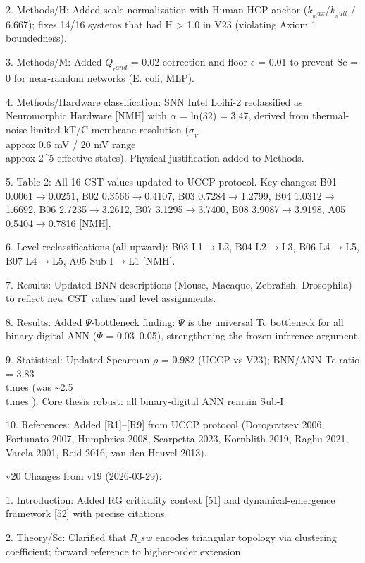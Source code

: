 \documentclass[a4paper,12pt]{article}
\begin{document}
2. Methods/H: Added scale-normalization with Human HCP anchor ($k_{_max}$/$k_{_null}$ / 6.667); fixes 14/16 systems that had H > 1.0 in V23 (violating Axiom 1 boundedness).

3. Methods/M: Added $Q_{_rand}$ = 0.02 correction and floor $\epsilon$ = 0.01 to prevent Sc = 0 for near-random networks (E. coli, MLP).

4. Methods/Hardware classification: SNN Intel Loihi-2 reclassified as Neuromorphic Hardware [NMH] with $\alpha$ = ln(32) = 3.47, derived from thermal-noise-limited kT/C membrane resolution ($\sigma_{_V}$  \\approx  0.6 mV / 20 mV range  \\approx  2^5 effective states). Physical justification added to Methods.

5. Table 2: All 16 CST values updated to UCCP protocol. Key changes: B01 0.0061$\rightarrow$0.0251, B02 0.3566$\rightarrow$0.4107, B03 0.7284$\rightarrow$1.2799, B04 1.0312$\rightarrow$1.6692, B06 2.7235$\rightarrow$3.2612, B07 3.1295$\rightarrow$3.7400, B08 3.9087$\rightarrow$3.9198, A05 0.5404$\rightarrow$0.7816 [NMH].

6. Level reclassifications (all upward): B03 L1$\rightarrow$L2, B04 L2$\rightarrow$L3, B06 L4$\rightarrow$L5, B07 L4$\rightarrow$L5, A05 Sub-I$\rightarrow$L1 [NMH].

7. Results: Updated BNN descriptions (Mouse, Macaque, Zebrafish, Drosophila) to reflect new CST values and level assignments.

8. Results: Added $\Psi$-bottleneck finding: $\Psi$ is the universal Tc bottleneck for all binary-digital ANN ($\Psi$ = 0.03--0.05), strengthening the frozen-inference argument.

9. Statistical: Updated Spearman $\rho$ = 0.982 (UCCP vs V23); BNN/ANN Tc ratio = 3.83 \\times  (was \textasciitilde{}2.5 \\times ). Core thesis robust: all binary-digital ANN remain Sub-I.

10. References: Added [R1]--[R9] from UCCP protocol (Dorogovtsev 2006, Fortunato 2007, Humphries 2008, Scarpetta 2023, Kornblith 2019, Raghu 2021, Varela 2001, Reid 2016, van den Heuvel 2013).

v20 Changes from v19 (2026-03-29):

1. Introduction: Added RG criticality context [51] and dynamical-emergence framework [52] with precise citations

2. Theory/Sc: Clarified that $R\_{sw}$ encodes triangular topology via clustering coefficient; forward reference to higher-order extension
\end{document}
